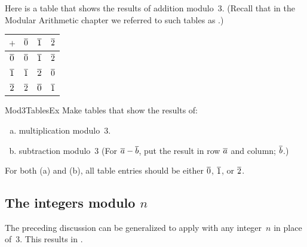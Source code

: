 \begin{eg}
Here is a table that shows the results of addition modulo~$3$. (Recall that in the Modular Arithmetic chapter we referred to such tables as .)
\begin{center} \begin{tabular}{c|c c c}
$+$&$\overline{0}$&$\overline{1}$&$\overline{2}$\\ \hline
$\overline{0}$&$\overline{0}$&$\overline{1}$&$\overline{2}$ \\
$\overline{1}$&$\overline{1}$&$\overline{2}$&$\overline{0}$ \\
$\overline{2}$&$\overline{2}$&$\overline{0}$&$\overline{1}$ \\
\end{tabular}
\end{center}
\end{eg}


\begin{exercise}{Mod3TablesEx}
Make tables that show the results of:
\begin{enumerate}[(a)]
\item \label{Mod3TablesEx-multiplication}
multiplication modulo~$3$.
\item \label{Mod3TablesEx-subtraction}
subtraction modulo~$3$ (For $\overline{a} - \overline{b}$,  put the result in row $\overline{a}$ and column; $\overline{b}$.)
\end{enumerate}
For both (a) and (b), all table entries should be  either $\overline{0}$, $\overline{1}$, or $\overline{2}$.
\end{exercise}



\subsection{The integers modulo $n$}
The preceding discussion can be generalized to apply with any integer~$n$ in place of~$3$. This results in .

